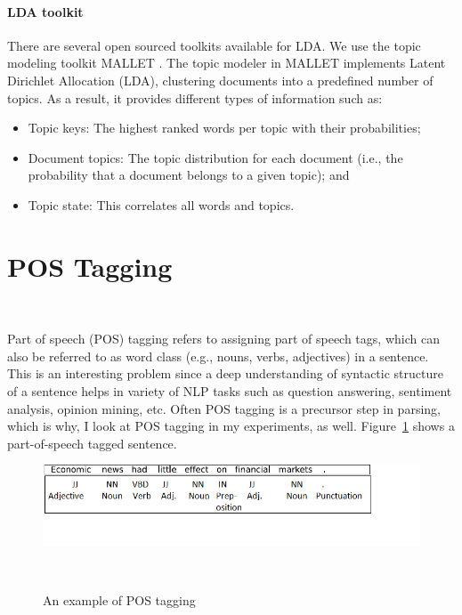 \paragraph*{LDA toolkit}

There are several  open sourced toolkits available for LDA. We use the topic modeling toolkit MALLET \cite{McCallumMALLET}.  The
topic modeler in MALLET implements Latent Dirichlet Allocation (LDA), clustering
documents into a predefined number of topics. As a result, it provides
different types of information such as:

\begin{itemize}
	\item  Topic keys:  The highest ranked words per topic with their probabilities; 
	
	\item Document topics: The topic distribution for each document (i.e., the probability that a document belongs to a given topic); and 
	
	\item Topic state: This correlates all words and topics.
	
\end{itemize}

\section{POS Tagging}~\label{sec:postaggingmethod}

Part of speech (POS) tagging refers to assigning part of speech tags, which can also be referred to as word class (e.g., nouns, verbs, adjectives) in a sentence. This is an interesting problem since a deep understanding of syntactic structure of a sentence helps in variety of NLP tasks such as question answering, sentiment analysis, opinion mining, etc. Often POS tagging is a precursor step in parsing, which is why, I look at POS tagging in my experiments, as well. Figure~\ref{fig:postag} shows a part-of-speech tagged sentence.

\begin{figure}[t]
    \centering
    \includegraphics[scale = 0.9]{figures/postagging.png}
    
    \caption{An example of POS tagging}~\label{fig:postag}
\end{figure}

